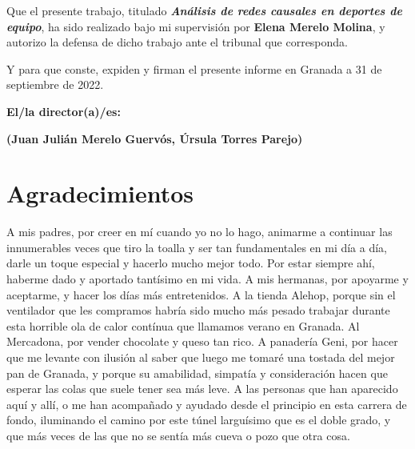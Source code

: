 Que el presente trabajo, titulado \textit{\textbf{Análisis de redes causales en deportes de equipo}},
ha sido realizado bajo mi supervisión por \textbf{Elena Merelo Molina}, y autorizo la defensa de dicho 
trabajo ante el tribunal que corresponda.

\vspace{0.5cm}

Y para que conste, expiden y firman el presente informe en Granada a 31 de septiembre de 2022.

\vspace{1cm}

\textbf{El/la director(a)/es: }

\vspace{5cm}

\noindent \textbf{(Juan Julián Merelo Guervós, Úrsula Torres Parejo)}

\chapter*{Agradecimientos}

A mis padres, por creer en mí cuando yo no lo hago, animarme a continuar las innumerables veces que tiro la 
toalla y ser tan fundamentales en mi día a día, darle un toque especial y hacerlo mucho mejor todo. Por estar 
siempre ahí, haberme dado y aportado tantísimo en mi vida. A mis hermanas, por apoyarme y aceptarme, y hacer los 
días más entretenidos. A la tienda Alehop, porque sin el ventilador que les compramos habría sido mucho 
más pesado trabajar durante esta horrible ola de calor contínua que llamamos verano en Granada. Al Mercadona, 
por vender chocolate y queso tan rico. A panadería Geni, por hacer que me levante con ilusión al saber que 
luego me tomaré una tostada del mejor pan de Granada, y porque su amabilidad, simpatía y consideración 
hacen que esperar las colas que suele tener sea más leve. A las personas que han aparecido aquí y allí, o 
me han acompañado y ayudado desde el principio en esta carrera de fondo, iluminando el camino por este 
túnel larguísimo que es el doble grado, y que más veces de las que no se sentía más cueva o pozo que otra cosa. 


